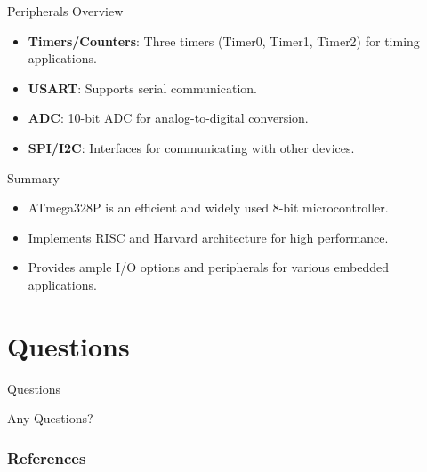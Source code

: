 \documentclass[aspectratio=169]{beamer}
\begin{document}
\begin{frame}{Peripherals Overview}
    \begin{itemize}
        \item \textbf{Timers/Counters}: Three timers (Timer0, Timer1, Timer2) for timing applications.
        \item \textbf{USART}: Supports serial communication.
        \item \textbf{ADC}: 10-bit ADC for analog-to-digital conversion.
        \item \textbf{SPI/I2C}: Interfaces for communicating with other devices.
    \end{itemize}
\end{frame}

\begin{frame}{Summary}
    \begin{itemize}
        \item ATmega328P is an efficient and widely used 8-bit microcontroller.
        \item Implements RISC and Harvard architecture for high performance.
        \item Provides ample I/O options and peripherals for various embedded applications.
    \end{itemize}
\end{frame}

\section{Questions}
\begin{frame}{Questions}
    \begin{center}
        \Huge{Any Questions?}
    \end{center}
\end{frame}

\begin{frame}
    \frametitle{References}
    \printbibliography
\end{frame}
\end{document}
